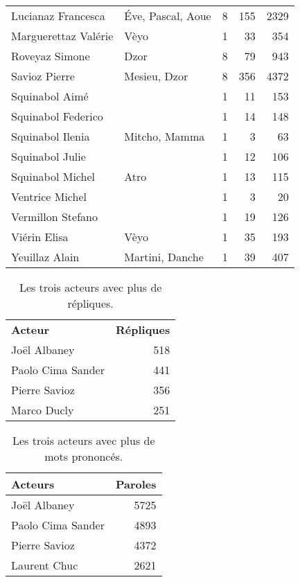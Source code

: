 \begin{longtable}{llrrr}
Lucianaz Francesca &Éve, Pascal, Aoue & 8 & 155 & 2329\\
Marguerettaz Valérie &Vèyo & 1 & 33 & 354\\
Roveyaz Simone &Dzor & 8 & 79 & 943\\
Savioz Pierre &Mesieu, Dzor & 8 & 356 & 4372\\
Squinabol Aimé & & 1 & 11 & 153\\
Squinabol Federico & & 1 & 14 & 148\\
Squinabol Ilenia &Mitcho, Mamma & 1 & 3 & 63\\
Squinabol Julie & & 1 & 12 & 106\\
Squinabol Michel &Atro & 1 & 13 & 115\\
Ventrice Michel & & 1 & 3 & 20\\
Vermillon Stefano & & 1 & 19 & 126\\
Viérin Elisa &Vèyo & 1 & 35 & 193\\
Yeuillaz Alain &Martini, Danche & 1 & 39 & 407\\
\bottomrule
\end{longtable}
\begin{table}[]
\centering
\caption{Les trois acteurs avec plus de répliques.}
\begin{tabular}{l|r}
\toprule
\multicolumn{1}{l}{\textbf{Acteur}} & \textbf{Répliques} \\

\multicolumn{1}{l}{Joël Albaney} &518\\
\multicolumn{1}{l}{Paolo Cima Sander} &441\\
\multicolumn{1}{l}{Pierre Savioz} &356\\
\multicolumn{1}{l}{Marco Ducly} &251\\
\bottomrule
\end{tabular}%
\end{table}
\newpage
\begin{table}[]
\centering
\caption{Les trois acteurs avec plus de mots prononcés.}
\begin{tabular}{l|r}
    \toprule
\multicolumn{1}{l}{\textbf{Acteurs}} & \textbf{Paroles} \\
    \midrule
\multicolumn{1}{l}{Joël Albaney} &5725\\
\multicolumn{1}{l}{Paolo Cima Sander} &4893\\
\multicolumn{1}{l}{Pierre Savioz} &4372\\
\multicolumn{1}{l}{Laurent Chuc} &2621\\
\bottomrule
\end{tabular}%
\end{table}
